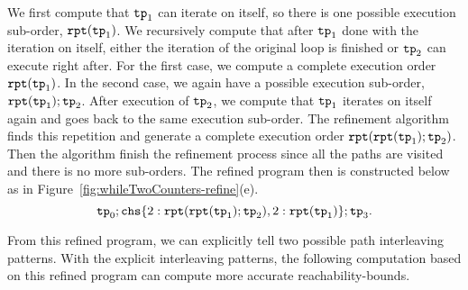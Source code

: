 We first compute that $\mathtt{tp}_1$ can iterate on itself, so there is one possible execution sub-order,
$\mathtt{rpt}(\mathtt{tp}_1)$.
We recursively compute that after $\mathtt{tp}_1$ done with the iteration on itself,
either the iteration of the original loop is finished
or $\mathtt{tp}_2$ can execute right after.
For the first case, we compute a complete execution order $\mathtt{rpt}(\mathtt{tp}_1)$.
In the second case, we again have a possible execution sub-order, $\mathtt{rpt}(\mathtt{tp}_1); \mathtt{tp}_2$.
After execution of $\mathtt{tp}_2$, we compute that $\mathtt{tp}_1$ iterates on itself again
and goes back to the same execution sub-order. 
The refinement algorithm finds this repetition and generate a complete execution order
$\mathtt{rpt}(\mathtt{rpt}(\mathtt{tp}_1); \mathtt{tp}_2)$.
Then the algorithm finish the refinement process since all the paths are visited and there is no more sub-orders. 
The refined program then is constructed below as in Figure~\ref{fig:whileTwoCounters-refine}(e).
\[
   \tpath_0 ; 
   \rpchoose{2: \rprepeat(\rprepeat(\tpath_1); \tpath_2), 
   2: \rprepeat(\tpath_1)}; \tpath_3.
\]

From this refined program, we can explicitly tell two possible path interleaving patterns.
With the explicit interleaving patterns, the following computation based on this refined program can compute more accurate reachability-bounds.
